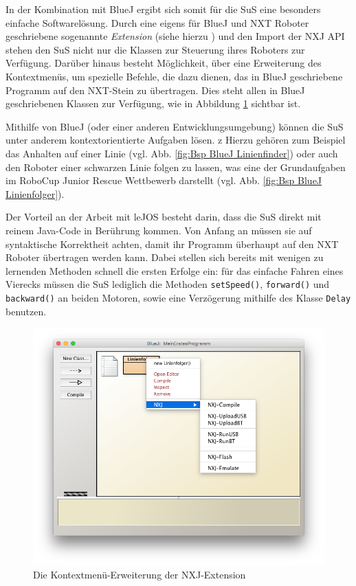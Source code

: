 \documentclass[paper=a4, DIV=calc, BCOR=12mm, twoside=on, onecolumn=on, open = right, titlepage =on, parskip =half-, headsepline = on, footsepline = off, chapterprefix = off, appendixprefix = on, fontsize = 12pt, numbers = noenddot, abstract = on]{scrbook}
\begin{document}
In der Kombination mit BlueJ ergibt sich somit für die SuS eine besonders einfache Softwarelösung. Durch eine eigens für BlueJ und NXT Roboter geschriebene sogenannte \textit{Extension} (siehe hierzu \cite{bowes:12}) und den Import der NXJ API stehen den SuS nicht nur die Klassen zur Steuerung ihres Roboters zur Verfügung. Darüber hinaus besteht Möglichkeit, über eine Erweiterung des Kontextmenüs, um spezielle Befehle, die dazu dienen, das in BlueJ geschriebene Programm auf den NXT-Stein zu übertragen. Dies steht allen in BlueJ geschriebenen Klassen zur Verfügung, wie in Abbildung \ref{fig:extension} sichtbar ist.


Mithilfe von BlueJ (oder einer anderen Entwicklungsumgebung) können die SuS unter anderem kontextorientierte Aufgaben lösen. z Hierzu gehören zum Beispiel das Anhalten auf einer Linie (vgl. Abb. \ref{fig:Bsp BlueJ Linienfinder}) oder auch den Roboter einer schwarzen Linie folgen zu lassen, was eine der Grundaufgaben im RoboCup Junior Rescue Wettbewerb darstellt (vgl. Abb. \ref{fig:Bsp BlueJ Linienfolger}).



Der Vorteil an der Arbeit mit leJOS besteht darin, dass die SuS direkt mit reinem Java-Code in Berührung kommen. Von Anfang an müssen sie auf syntaktische Korrektheit achten, damit ihr Programm überhaupt auf den NXT Roboter übertragen werden kann. Dabei stellen sich bereits mit wenigen zu lernenden Methoden schnell die ersten Erfolge ein: für das einfache Fahren eines Vierecks müssen die SuS lediglich die  Methoden \texttt{setSpeed()}, \texttt{forward()} und \texttt{backward()} an beiden Motoren, sowie eine Verzögerung mithilfe des Klasse \texttt{Delay} benutzen. 

\vspace*{2ex}
\begin{figure}[htbp]
\centering
\includegraphics[width=\textwidth]{images/extension.png}
\caption{Die Kontextmenü-Erweiterung der NXJ-Extension}
\label{fig:extension}
\end{figure}
\end{document}
